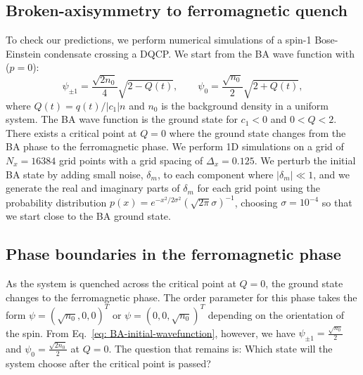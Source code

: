 \subsection{Broken-axisymmetry to ferromagnetic quench}
To check our predictions, we perform numerical simulations of a spin-1
Bose-Einstein condensate crossing a DQCP\@.
We start from the BA wave function with (\( p=0 \)):
\begin{equation}
    \psi_{\pm 1} = \frac{\sqrt{2n_0}}{4}\sqrt{2 - Q(t)}, \qquad
    \psi_0 = \frac{\sqrt{n_0}}{2}\sqrt{2 + Q(t)},
    \label{eq: BA-initial-wavefunction}
\end{equation}
where \(Q(t)=q(t)/|c_1|n\) and \(n_0\) is the background density in a uniform
system.
The BA wave function is the ground state for \(c_1 < 0\) and \(0 < Q < 2\).
There exists a critical point at \( Q = 0 \) where the ground state changes from
the BA phase to the ferromagnetic phase.
We perform 1D simulations on a grid of \(N_x = 16384\) grid points with a grid
spacing of \(\Delta_x = 0.125\).
We perturb the initial BA state by adding small noise, \(\delta_m\), to each
component where \(|\delta_m| \ll 1\), and we generate the real and imaginary
parts of \(\delta_m\) for each grid point using the probability distribution
\(p(x) = e^{-x^2/2\sigma^2}{(\sqrt{2\pi}\sigma)}^{-1}\), choosing
\(\sigma=10^{-4}\) so that we start close to the BA ground state.

\subsection{Phase boundaries in the ferromagnetic phase}
As the system is quenched across the critical point at \( Q = 0 \), the ground
state changes to the ferromagnetic phase.
The order parameter for this phase takes the form \(\psi={(\sqrt{n_0},0,0)}^T\)
or \(\psi={(0,0,\sqrt{n_0})}^T\) depending on the orientation of the spin.
From Eq.~\eqref{eq: BA-initial-wavefunction}, however, we have
\(\psi_{\pm 1} = \frac{\sqrt{n_0}}{2}\) and \(\psi_0 = \frac{\sqrt{2n_0}}{2}\)
at \( Q = 0 \).
The question that remains is: Which state will the system choose after
the critical point is passed?

